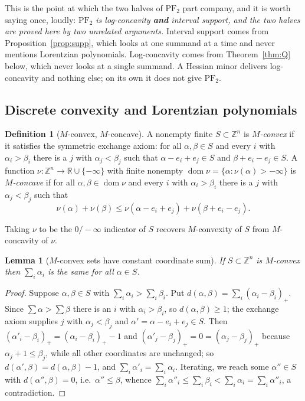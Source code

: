 \documentclass[11pt]{article}
\theoremstyle{plain}
\newtheorem{lemma}[theorem]{Lemma}
\theoremstyle{definition}
\newtheorem{definition}[theorem]{Definition}
\DeclareMathOperator{\dom}{dom}
\newcommand{\PFtwo}{\mathrm{PF}_2}
\newcommand{\Z}{\mathbb{Z}}
\newcommand{\R}{\mathbb{R}}
\begin{document}
This is the point at which the two halves of $\PFtwo$ part company, and it is worth saying
once, loudly: \emph{$\PFtwo$ is log-concavity \textbf{and} interval support, and the two
halves are proved here by two unrelated arguments.} Interval support comes from
Proposition~\ref{prop:supp}, which looks at one summand at a time and never mentions
Lorentzian polynomials. Log-concavity comes from Theorem~\ref{thm:Q} below, which never
looks at a single summand. A Hessian minor delivers log-concavity and nothing else; on its
own it does not give $\PFtwo$.

\subsection*{Discrete convexity and Lorentzian polynomials}

\begin{definition}[$M$-convex, $M$-concave]
A nonempty finite $S\subset\Z^n$ is \emph{$M$-convex} if it satisfies the symmetric
exchange axiom: for all $\alpha,\beta\in S$ and every $i$ with $\alpha_i>\beta_i$ there is
a $j$ with $\alpha_j<\beta_j$ such that $\alpha-e_i+e_j\in S$ and $\beta+e_i-e_j\in S$.
A function $\nu:\Z^n\to\R\cup\{-\infty\}$ with finite nonempty
$\dom\nu=\{\alpha:\nu(\alpha)>-\infty\}$ is \emph{$M$-concave} if for all
$\alpha,\beta\in\dom\nu$ and every $i$ with $\alpha_i>\beta_i$ there is a $j$ with
$\alpha_j<\beta_j$ such that
\[
  \nu(\alpha)+\nu(\beta)\le\nu(\alpha-e_i+e_j)+\nu(\beta+e_i-e_j).
\]
\end{definition}

Taking $\nu$ to be the $0/-\infty$ indicator of $S$ recovers $M$-convexity of $S$ from
$M$-concavity of $\nu$.

\begin{lemma}[$M$-convex sets have constant coordinate sum]\label{lem:constsum}
If $S\subset\Z^n$ is $M$-convex then $\sum_i\alpha_i$ is the same for all $\alpha\in S$.
\end{lemma}

\begin{proof}
Suppose $\alpha,\beta\in S$ with $\sum_i\alpha_i>\sum_i\beta_i$. Put
$d(\alpha,\beta)=\sum_i(\alpha_i-\beta_i)_+$. Since $\sum\alpha>\sum\beta$ there is an $i$
with $\alpha_i>\beta_i$, so $d(\alpha,\beta)\ge1$; the exchange axiom supplies $j$ with
$\alpha_j<\beta_j$ and $\alpha'=\alpha-e_i+e_j\in S$. Then
$(\alpha'_i-\beta_i)_+=(\alpha_i-\beta_i)_+-1$ and $(\alpha'_j-\beta_j)_+=0=(\alpha_j-\beta_j)_+$
because $\alpha_j+1\le\beta_j$, while all other coordinates are unchanged; so
$d(\alpha',\beta)=d(\alpha,\beta)-1$, and $\sum_i\alpha'_i=\sum_i\alpha_i$. Iterating, we
reach some $\alpha''\in S$ with $d(\alpha'',\beta)=0$, i.e.\ $\alpha''\le\beta$, whence
$\sum_i\alpha''_i\le\sum_i\beta_i<\sum_i\alpha_i=\sum_i\alpha''_i$, a contradiction.
\end{proof}
\end{document}
